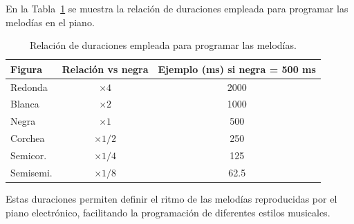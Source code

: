 En la Tabla~\ref{tab:figuras_piano} se muestra la relación de duraciones empleada para programar las melodías en el piano.

\begin{table}[H]
\centering
\begin{tabular}{|l|c|c|}
\hline
\textbf{Figura} & \textbf{Relación vs negra} & \textbf{Ejemplo (ms) si negra = 500 ms} \\
\hline
Redonda  & $\times 4$   & 2000 \\
Blanca   & $\times 2$   & 1000 \\
Negra    & $\times 1$   & 500 \\
Corchea  & $\times 1/2$ & 250 \\
Semicor. & $\times 1/4$ & 125 \\
Semisemi. & $\times 1/8$ & 62.5 \\
\hline
\end{tabular}
\caption{Relación de duraciones empleada para programar las melodías.}
\label{tab:figuras_piano}
\end{table}

Estas duraciones permiten definir el ritmo de las melodías reproducidas por el piano electrónico, facilitando la programación de diferentes estilos musicales.